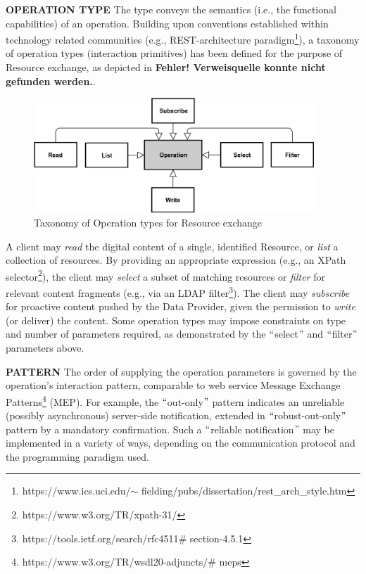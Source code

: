 \textbf{OPERATION TYPE} The type conveys the semantics (i.e., the functional capabilities) of an operation. Building upon conventions established within technology related communities (e.g., REST-architecture paradigm\footnote{https://www.ics.uci.edu/$ \sim $ fielding/pubs/dissertation/rest\_arch\_style.htm }), a taxonomy of operation types (interaction primitives) has been defined for the purpose of Resource exchange, as depicted in \textbf{Fehler! Verweisquelle konnte nicht gefunden werden.}. 




\begin{figure}[H]
	\begin{Center}
		\includegraphics[width=4.15in,height=1.7in]{./media/image40.png}
		\caption{Taxonomy of Operation types for Resource exchange}
		\label{fig:Taxonomy_of_Operation_types_for_Resource_exchange}
	\end{Center}
\end{figure}





A client may\textit{ read} the digital content of a single, identified Resource, or \textit{list} a collection of resources. By providing an appropriate expression (e.g., an XPath selector\footnote{https://www.w3.org/TR/xpath-31/ }), the client may \textit{select } a subset of matching resources or \textit{filter } for relevant content fragments (e.g., via an LDAP filter\footnote{https://tools.ietf.org/search/rfc4511$\#$ section-4.5.1 }). The client may \textit{subscribe} for proactive content pushed by the Data Provider, given the permission to \textit{write} (or deliver) the content. Some operation types may impose constraints on type and number of parameters required, as demonstrated by the $``$select$"$  and $``$filter$"$  parameters above.

\textbf{PATTERN }The order of supplying the operation parameters is governed by the operation’s interaction pattern, comparable to web service Message Exchange Patterns\footnote{https://www.w3.org/TR/wsdl20-adjuncts/$\#$ meps } (MEP). For example, the $``$out-only$"$  pattern indicates an unreliable (possibly asynchronous) server-side notification, extended in $``$robust-out-only$"$  pattern by a mandatory confirmation. Such a $``$reliable notification$"$  may be implemented in a variety of ways, depending on the communication protocol and the programming paradigm used.

